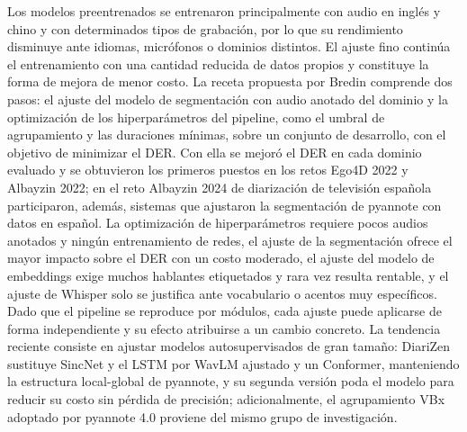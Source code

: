 \documentclass[11pt,a4paper]{article}
\begin{document}
Los modelos preentrenados se entrenaron principalmente con audio en inglés y chino y con determinados tipos de grabación, por lo que su rendimiento disminuye ante idiomas, micrófonos o dominios distintos. El ajuste fino continúa el entrenamiento con una cantidad reducida de datos propios y constituye la forma de mejora de menor costo. La receta propuesta por Bredin \cite{bredin2023} comprende dos pasos: el ajuste del modelo de segmentación con audio anotado del dominio y la optimización de los hiperparámetros del pipeline, como el umbral de agrupamiento y las duraciones mínimas, sobre un conjunto de desarrollo, con el objetivo de minimizar el DER. Con ella se mejoró el DER en cada dominio evaluado y se obtuvieron los primeros puestos en los retos Ego4D 2022 y Albayzin 2022; en el reto Albayzin 2024 de diarización de televisión española participaron, además, sistemas que ajustaron la segmentación de pyannote con datos en español. La optimización de hiperparámetros requiere pocos audios anotados y ningún entrenamiento de redes, el ajuste de la segmentación ofrece el mayor impacto sobre el DER con un costo moderado, el ajuste del modelo de embeddings exige muchos hablantes etiquetados y rara vez resulta rentable, y el ajuste de Whisper solo se justifica ante vocabulario o acentos muy específicos. Dado que el pipeline se reproduce por módulos, cada ajuste puede aplicarse de forma independiente y su efecto atribuirse a un cambio concreto. La tendencia reciente consiste en ajustar modelos autosupervisados de gran tamaño: DiariZen \cite{han2024,han2025,raghav2026} sustituye SincNet y el LSTM por WavLM ajustado y un Conformer, manteniendo la estructura local-global de pyannote, y su segunda versión poda el modelo para reducir su costo sin pérdida de precisión; adicionalmente, el agrupamiento VBx adoptado por pyannote 4.0 proviene del mismo grupo de investigación.
\end{document}
